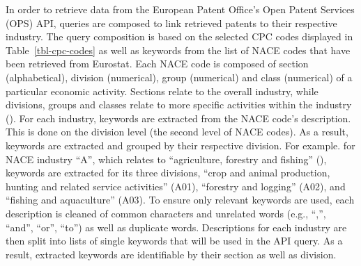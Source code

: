 \documentclass[
  12pt,
  a4paperpaper,
]{article}
\begin{document}
In order to retrieve data from the European Patent Office's Open Patent
Services (OPS) API, queries are composed to link retrieved patents to
their respective industry. The query composition is based on the
selected CPC codes displayed in Table~\ref{tbl-cpc-codes} as well as
keywords from the list of NACE codes that have been retrieved from
Eurostat. Each NACE code is composed of section (alphabetical), division
(numerical), group (numerical) and class (numerical) of a particular
economic activity. Sections relate to the overall industry, while
divisions, groups and classes relate to more specific activities within
the industry (). For
each industry, keywords are extracted from the NACE code's description.
This is done on the division level (the second level of NACE codes). As
a result, keywords are extracted and grouped by their respective
division. For example. for NACE industry ``A'', which relates to
``agriculture, forestry and fishing''
(), keywords are extracted for its three
divisions, ``crop and animal production, hunting and related service
activities'' (A01), ``forestry and logging'' (A02), and ``fishing and
aquaculture'' (A03). To ensure only relevant keywords are used, each
description is cleaned of common characters and unrelated words (e.g.,
``,'', ``and'', ``or'', ``to'') as well as duplicate words. Descriptions
for each industry are then split into lists of single keywords that will
be used in the API query. As a result, extracted keywords are
identifiable by their section as well as division.
\end{document}
